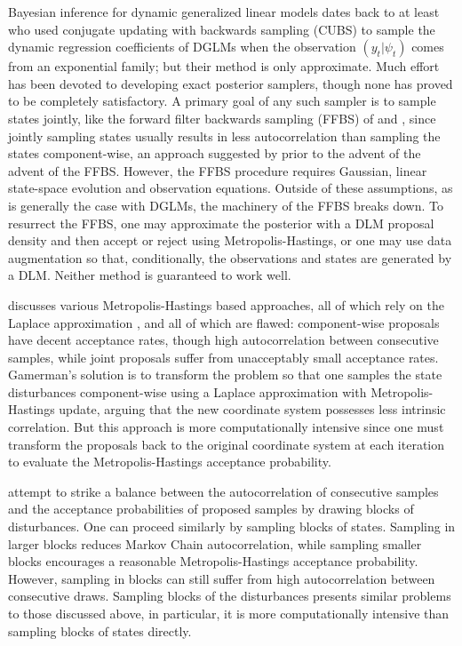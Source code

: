 \documentclass[12pt]{article}
\begin{document}
Bayesian inference for dynamic generalized linear models dates back to at least
\cite{west-etal-1985} who used conjugate updating with backwards sampling (CUBS)
to sample the dynamic regression coefficients of DGLMs when the observation
$(y_t | \psi_t)$ comes from an exponential family; but their method is only
approximate.  Much effort has been devoted to developing exact posterior
samplers, though none has proved to be completely satisfactory.  A primary goal
of any such sampler is to sample states jointly, like the forward filter
backwards sampling (FFBS) of \cite{fruhwirth-schnatter-1994} and
\cite{carter-kohn-1994}, since jointly sampling states usually results in less
autocorrelation than sampling the states component-wise, an approach suggested
by \cite{carlin-etal-1992} prior to the advent of the advent of the FFBS.
However, the FFBS procedure requires Gaussian, linear state-space evolution and
observation equations.  Outside of these assumptions, as is generally the case
with DGLMs, the machinery of the FFBS breaks down.  To resurrect the FFBS, one
may approximate the posterior with a DLM proposal density and then accept or
reject using Metropolis-Hastings, or one may use data augmentation so that,
conditionally, the observations and states are generated by a DLM.  Neither
method is guaranteed to work well.

\cite{gamerman-1998} discusses various Metropolis-Hastings based approaches, all
of which rely on the Laplace approximation \citep{robert-casella-2005-book}, and
all of which are flawed: component-wise proposals have decent acceptance rates,
though high autocorrelation between consecutive samples, while joint proposals
suffer from unacceptably small acceptance rates.  Gamerman's solution is to
transform the problem so that one samples the state disturbances
component-wise using a Laplace approximation with Metropolis-Hastings update,
arguing that the new coordinate system possesses less intrinsic correlation.
But this approach is more computationally intensive since one must transform the
proposals back to the original coordinate system at each iteration to evaluate
the Metropolis-Hastings acceptance probability.

\cite{shephard-pitt-1997} attempt to strike a balance between the
autocorrelation of consecutive samples and the acceptance probabilities of
proposed samples by drawing blocks of disturbances.  One can proceed similarly
by sampling blocks of states.  Sampling in larger blocks reduces Markov Chain
autocorrelation, while sampling smaller blocks encourages a reasonable
Metropolis-Hastings acceptance probability.  However, sampling in blocks can
still suffer from high autocorrelation between consecutive draws.  Sampling
blocks of the disturbances presents similar problems to those discussed above,
in particular, it is more computationally intensive than sampling blocks of
states directly.
\end{document}

